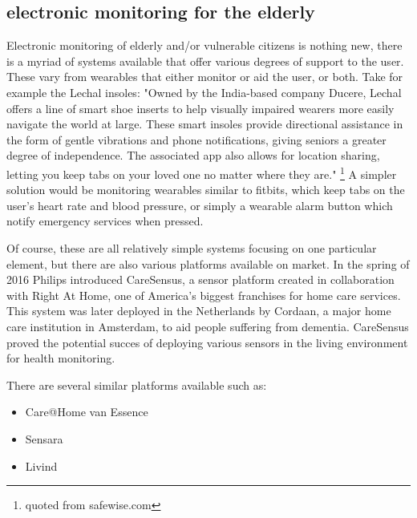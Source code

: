 \documentclass{below-ext}
\begin{document}
\subsection{electronic monitoring for the elderly}
Electronic monitoring of elderly and/or vulnerable citizens is nothing new, there is a myriad of systems available that offer various degrees of support to the user. These vary from wearables that either monitor or aid the user, or both. Take for example the Lechal insoles: "Owned by the India-based company Ducere, Lechal offers a line of smart shoe inserts to help visually impaired wearers more easily navigate the world at large. These smart insoles provide directional assistance in the form of gentle vibrations and phone notifications, giving seniors a greater degree of independence. The associated app also allows for location sharing, letting you keep tabs on your loved one no matter where they are." \footnote{quoted from safewise.com} A simpler solution would be monitoring wearables similar to fitbits, which keep tabs on the user's heart rate and blood pressure, or simply a wearable alarm button which notify emergency services when pressed.

Of course, these are all relatively simple systems focusing on one particular element, but there are also various platforms available on market. In the spring of 2016 Philips introduced CareSensus, a sensor platform created in collaboration with Right At Home, one of America's biggest franchises for  home care services. This system was later deployed in the Netherlands by Cordaan, a major home care institution in Amsterdam, to aid people suffering from dementia. CareSensus proved the potential succes of deploying various sensors in the living environment for health monitoring.

There are several similar platforms available such as:

\begin{itemize}
\item Care@Home van Essence
\item Sensara
\item Livind
\end{itemize}
\end{document}
